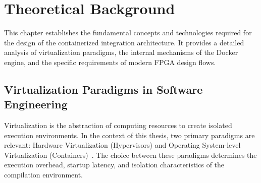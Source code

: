 % 
% 
% 

\chapter{Theoretical Background}
\label{ch:background}

This chapter establishes the fundamental concepts and technologies required for the design of the containerized integration architecture. It provides a detailed analysis of virtualization paradigms, the internal mechanisms of the Docker engine, and the specific requirements of modern FPGA design flows.

\section{Virtualization Paradigms in Software Engineering}
Virtualization is the abstraction of computing resources to create isolated execution environments. In the context of this thesis, two primary paradigms are relevant: Hardware Virtualization (Hypervisors) and Operating System-level Virtualization (Containers)~\cite{felter2015performance}. The choice between these paradigms determines the execution overhead, startup latency, and isolation characteristics of the compilation environment.

